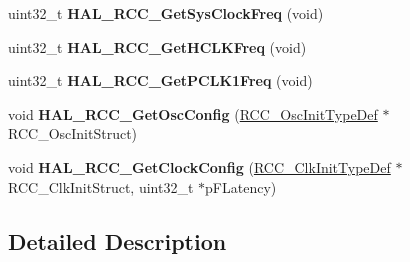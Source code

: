 \begin{DoxyCompactItemize}
uint32\+\_\+t {\bfseries H\+A\+L\+\_\+\+R\+C\+C\+\_\+\+Get\+Sys\+Clock\+Freq} (void)
\item 
\mbox{\label{group___r_c_c___exported___functions___group2_ga38d6c5c7a5d8758849912c9aa0a2156d}} 
uint32\+\_\+t {\bfseries H\+A\+L\+\_\+\+R\+C\+C\+\_\+\+Get\+H\+C\+L\+K\+Freq} (void)
\item 
\mbox{\label{group___r_c_c___exported___functions___group2_gab3042d8ac5703ac696cabf0ee461c599}} 
uint32\+\_\+t {\bfseries H\+A\+L\+\_\+\+R\+C\+C\+\_\+\+Get\+P\+C\+L\+K1\+Freq} (void)
\item 
\mbox{\label{group___r_c_c___exported___functions___group2_gae2f9413fc447c2d7d6af3a8669c77b36}} 
void {\bfseries H\+A\+L\+\_\+\+R\+C\+C\+\_\+\+Get\+Osc\+Config} (\hyperlink{struct_r_c_c___osc_init_type_def}{R\+C\+C\+\_\+\+Osc\+Init\+Type\+Def} $\ast$R\+C\+C\+\_\+\+Osc\+Init\+Struct)
\item 
\mbox{\label{group___r_c_c___exported___functions___group2_gabc95375dfca279d88b9ded9d063d2323}} 
void {\bfseries H\+A\+L\+\_\+\+R\+C\+C\+\_\+\+Get\+Clock\+Config} (\hyperlink{struct_r_c_c___clk_init_type_def}{R\+C\+C\+\_\+\+Clk\+Init\+Type\+Def} $\ast$R\+C\+C\+\_\+\+Clk\+Init\+Struct, uint32\+\_\+t $\ast$p\+F\+Latency)
\end{DoxyCompactItemize}


\subsection{Detailed Description}
